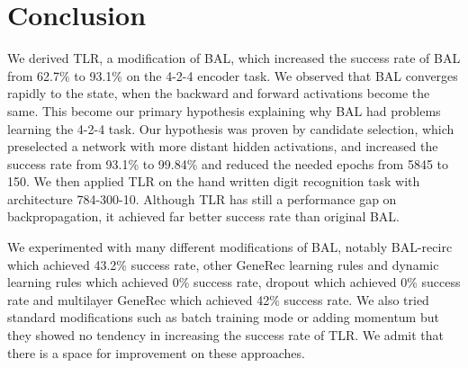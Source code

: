 
\section*{Conclusion}
\label{sec:conclusion} 

We derived TLR, a modification of BAL, which increased the success rate of BAL from 62.7\% to 93.1\% on the 4-2-4 encoder task. We observed that BAL converges rapidly to the state, when the backward and forward activations become the same. This become our primary hypothesis explaining why BAL had problems learning the 4-2-4 task. Our hypothesis was proven by candidate selection, which preselected a network with more distant hidden activations, and increased the success rate from 93.1\% to 99.84\% and reduced the needed epochs from 5845 to 150. We then applied TLR on the hand written digit recognition task with architecture 784-300-10. Although TLR has still a performance gap on backpropagation, it achieved far better success rate than original BAL. %

We experimented with many different modifications of BAL, notably BAL-recirc which achieved 43.2\% success rate, other GeneRec learning rules and dynamic learning rules which achieved 0\% success rate, dropout which achieved 0\% success rate and multilayer GeneRec which achieved 42\% success rate. We also tried standard modifications such as batch training mode or adding momentum but they showed no tendency in increasing the success rate of TLR. We admit that there is a space for improvement on these approaches.

